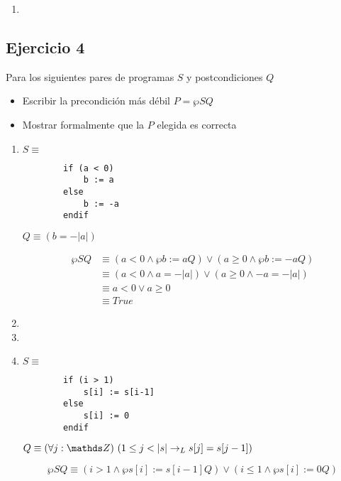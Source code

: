 \begin{enumerate}[label=\alph*)]
    \item \hacer
\end{enumerate}

\subsection{Ejercicio 4}
Para los siguientes pares de programas $S$ y postcondiciones $Q$

\begin{itemize}
    \item Escribir la precondición más débil $P = \wp{S}{Q}$
    \item Mostrar formalmente que la $P$ elegida es correcta
\end{itemize}

\begin{enumerate}[label=\alph*)]
    \item $S \equiv$

          \begin{lstlisting}
        if (a < 0)
            b := a
        else
            b := -a
        endif
    \end{lstlisting}

          $Q \equiv (b = - |a|)$

          \begin{align*}
              \wp{S}{Q} & \equiv (a < 0 \land \wp{b := a}{Q}) \lor (a \geq 0 \land \wp{b := -a}{Q}) \\
                        & \equiv (a < 0 \land a = - |a|) \lor (a \geq 0 \land -a = - |a|)           \\
                        & \equiv a < 0 \lor a \geq 0                                                \\
                        & \equiv True
          \end{align*}

    \item \hacer
    \item \hacer

    \item $S \equiv$

          \begin{lstlisting}
        if (i > 1)
            s[i] := s[i-1]
        else
            s[i] := 0
        endif
    \end{lstlisting}

          $Q \equiv \paraTodo{j}{\ent}{1 \leq j < |s| \thenLuego s[j] = s[j - 1]}$

          \[
              \wp{S}{Q} \equiv (i > 1 \land \wp{s[i] := s[i-1]}{Q}) \lor (i \leq 1 \land \wp{s[i] := 0}{Q})
          \]


\end{enumerate}

